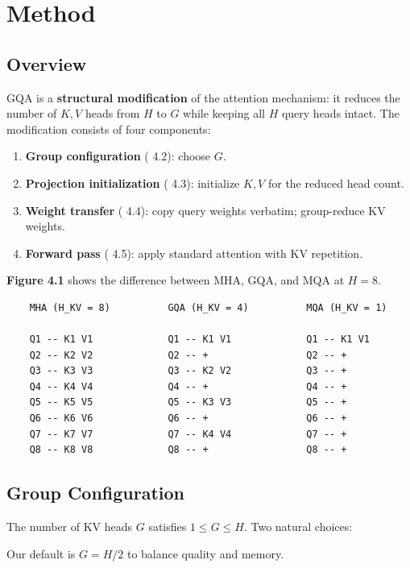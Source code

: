 
\section{Method}

\subsection{Overview}

GQA is a \textbf{structural modification} of the attention mechanism: it reduces 
the number of $K, V$ heads from $H$ to $G$ while keeping all $H$ query heads 
intact. The modification consists of four components:

\begin{enumerate}
\item \textbf{Group configuration} ( 4.2): choose $G$.
\item \textbf{Projection initialization} ( 4.3): initialize $K, V$ for the reduced head count.
\item \textbf{Weight transfer} ( 4.4): copy query weights verbatim; group-reduce KV weights.
\item \textbf{Forward pass} ( 4.5): apply standard attention with KV repetition.

\end{enumerate}
\textbf{Figure 4.1} shows the difference between MHA, GQA, and MQA at $H = 8$.

\begin{lstlisting}
    MHA (H_KV = 8)          GQA (H_KV = 4)          MQA (H_KV = 1)

    Q1 -- K1 V1             Q1 -- K1 V1             Q1 -- K1 V1
    Q2 -- K2 V2             Q2 -- +                 Q2 -- +
    Q3 -- K3 V3             Q3 -- K2 V2             Q3 -- +
    Q4 -- K4 V4             Q4 -- +                 Q4 -- +
    Q5 -- K5 V5             Q5 -- K3 V3             Q5 -- +
    Q6 -- K6 V6             Q6 -- +                 Q6 -- +
    Q7 -- K7 V7             Q7 -- K4 V4             Q7 -- +
    Q8 -- K8 V8             Q8 -- +                 Q8 -- +
\end{lstlisting}

\subsection{Group Configuration}

The number of KV heads $G$ satisfies $1 \le G \le H$. Two natural choices:

Our default is $G = H / 2$ to balance quality and memory.

